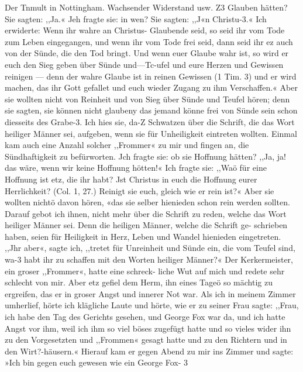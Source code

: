 Der Tnmult in Nottingham. Wachsender Widerstand usw. Z3
Glauben hätten? Sie sagten: ,,Ja.« Jeh fragte sie: in wen?
Sie sagten: ,,J«n Christu-3.« Ich erwiderte: Wenn ihr wahre
an Christus- Glaubende seid, so seid ihr vom Tode zum Leben
eingegangen, und wenn ihr vom Tode frei seid, dann seid ihr ez
auch von der Sünde, die den Tod bringt. Und wenn euer
Glaube wahr ist, so wird er euch den Sieg geben über Sünde
und—Tc-ufel und eure Herzen und Gewissen reinigen — denn der
wahre Glaube ist in reinen Gewissen (1 Tim. 3) und er wird
machen, das ihr Gott gefallet und euch wieder Zugang zu ihm
Verschaffen.« Aber sie wollten nicht von Reinheit und von Sieg
über Sünde und Teufel hören; denn sie sagten, sie können nicht
glaubeny das jemand könne frei von Sünde sein schon diesseits
des Grabe-3. Ich hies sie, da-Z Schwatzen über die Schrift, die
das Wort heiliger Männer sei, aufgeben, wenn sie für Unheiligkeit
eintreten wollten. Einmal kam auch eine Anzahl solcher ,,Frommer«
zu mir und fingen an, die Sündhaftigkeit zu befürworten. Jch
fragte sie: ob sie Hoffnung hätten? ,,Ja, ja! das wäre, wenn
wir keine Hoffnung hötten!« Ich fragte sie: ,,Waö für eine
Hoffnung ist etz, die ihr habt? Jst Christus in euch die Hoffnung
eurer Herrlichkeit? (Col. 1, 27.) Reinigt sie euch, gleich wie er
rein ist?« Aber sie wollten nichtö davon hören, «das sie selber
hienieden schon rein werden sollten. Darauf gebot ich ihnen,
nicht mehr über die Schrift zu reden, welche das Wort heiliger
Männer sei. Denn die heiligen Männer, welche die Schrift ge-
schrieben haben, seien für Heiligkeit in Herz, Leben und Wandel
hienieden eingetreten. ,,Jhr aber«, sagte ich, ,,tretet für Unreinheit
und Sünde ein, die vom Teufel sind, wa-3 habt ihr zu schaffen
mit den Worten heiliger Männer?«
Der Kerkermeister, ein groser ,,Frommer«, hatte eine schreck-
liche Wut auf mich und redete sehr schlecht von mir. Aber etz
gefiel dem Herm, ihn eines Tageö so mächtig zu ergreifen, das
er in groser Angst und innerer Not war. Als ich in meinem
Zimmer umherlief, hörte ich klägliche Laute und hörte, wie er zu
seiner Frau sagte: ,,Frau, ich habe den Tag des Gerichts gesehen,
und George Fox war da, und ich hatte Angst vor ihm, weil ich
ihm so viel böses zugefügt hatte und so vieles wider ihn zu den
Vorgesetzten und ,,Frommen« gesagt hatte und zu den Richtern
und in den Wirt?-häusern.« Hierauf kam er gegen Abend zu mir
ins Zimmer und sagte: »Ich bin gegen euch gewesen wie ein
George Fox- 3


